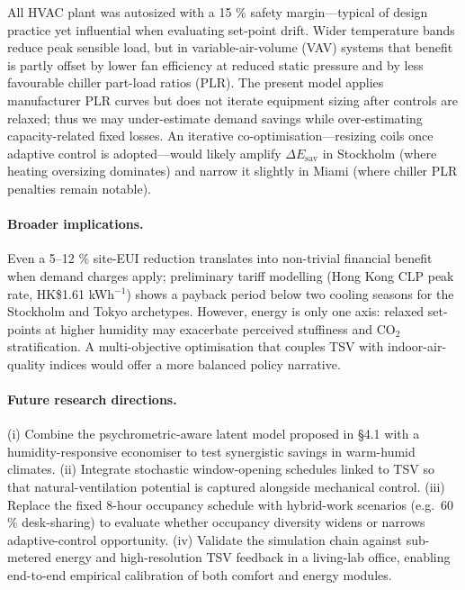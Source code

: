 All HVAC plant was autosized with a 15 \% safety margin—typical of design practice yet influential when evaluating set-point drift.  Wider temperature bands reduce peak sensible load, but in variable-air-volume (VAV) systems that benefit is partly offset by lower fan efficiency at reduced static pressure and by less favourable chiller part-load ratios (PLR).  The present model applies manufacturer PLR curves but does not iterate equipment sizing after controls are relaxed; thus we may under-estimate demand savings while over-estimating capacity-related fixed losses.  An iterative co-optimisation—resizing coils once adaptive control is adopted—would likely amplify \(\Delta E_{\text{sav}}\) in Stockholm (where heating oversizing dominates) and narrow it slightly in Miami (where chiller PLR penalties remain notable).

\paragraph{Broader implications.}
Even a 5–12 \% site-EUI reduction translates into non-trivial financial benefit when demand charges apply; preliminary tariff modelling (Hong Kong CLP peak rate, HK\$1.61 kWh\(^{-1}\)) shows a payback period below two cooling seasons for the Stockholm and Tokyo archetypes.  However, energy is only one axis: relaxed set-points at higher humidity may exacerbate perceived stuffiness and CO\(_2\) stratification.  A multi-objective optimisation that couples TSV with indoor-air-quality indices would offer a more balanced policy narrative.

\paragraph{Future research directions.}
(i) Combine the psychrometric-aware latent model proposed in §4.1 with a humidity-responsive economiser to test synergistic savings in warm-humid climates.  
(ii) Integrate stochastic window-opening schedules linked to TSV so that natural-ventilation potential is captured alongside mechanical control.  
(iii) Replace the fixed 8-hour occupancy schedule with hybrid-work scenarios (e.g.\ 60 \% desk-sharing) to evaluate whether occupancy diversity widens or narrows adaptive-control opportunity.  
(iv) Validate the simulation chain against sub-metered energy and high-resolution TSV feedback in a living-lab office, enabling end-to-end empirical calibration of both comfort and energy modules.

